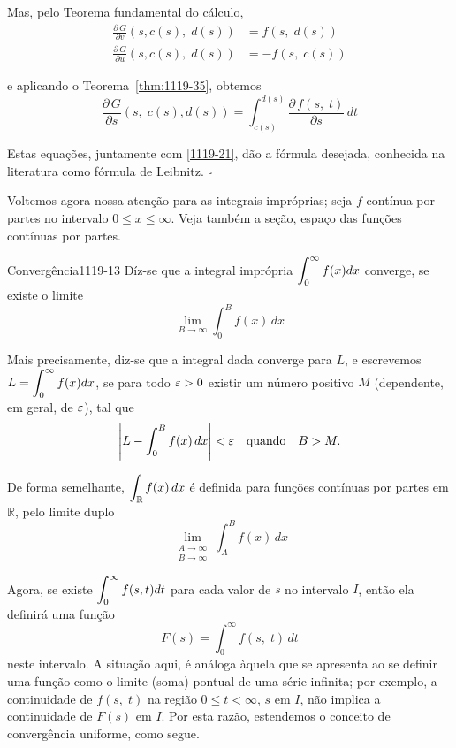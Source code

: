 Mas, pelo Teorema fundamental do cálculo,
\begin{align*}
  \frac{\partial\, G}{\partial v}(s,c(s),\; d(s)) &= f(s,\; d(s))\\[2ex]
  \frac{\partial\, G}{\partial u}(s,c(s),\; d(s)) &=-f(s,\; c(s))
\end{align*}

e aplicando o Teorema~\ref{thm:1119-35}, obtemos
\begin{equation*}
  \dfrac{\partial\, G}{\partial s}(s,\; c(s),d(s))=\int_{c(s)}^{d(s)}
    \dfrac{\partial\, f(s,\; t)}{\partial s}\, dt
\end{equation*}

Estas equações, juntamente com \eqref{1119-21}, dão a fórmula
desejada, conhecida na literatura como fórmula de Leibnitz.\hfill
$\square$

Voltemos agora nossa atenção para as integrais impróprias; seja
$f$ contínua por partes no intervalo $0\leq x \leq \infty$. Veja também a
seção, espaço das funções contínuas por partes.


\begin{defic}{Convergência}{1119-13} Díz-se que a integral imprópria
$\displaystyle{\int_0^\infty f(x)dx}$ converge, se existe o limite
\begin{equation*}
  \lim_{B\to \infty} \int_0^Bf(x)\, dx
\end{equation*}

Mais precisamente, diz-se que a integral dada converge para $L$, e
escrevemos $\displaystyle{L = \int_0^\infty f(x) dx}$, se para todo $\varepsilon >
0$ existir um número positivo $M$ (dependente, em geral, de
$\varepsilon$), tal que
\begin{equation*}
  \left|L - \int_0^Bf(x)\, dx\right| < \varepsilon\quad  \text{quando}\quad B> M.
\end{equation*}
\end{defic}

De forma semelhante, $\displaystyle{\int_{\mathbb{R}}f(x)\, dx}$ é definida
para funções contínuas por partes em $\mathbb{R}$, pelo limite
duplo
\begin{equation}
\lim_{\substack{A\to\infty\\B\to\infty}}\int_A^B f(x)\, dx
\end{equation}

Agora, se existe $\displaystyle{\int_0^\infty f(s, t) dt}$ para cada valor
de $s$ no intervalo $I$, então ela definirá uma função
\begin{equation*}
  F(s)=\int_0^\infty f(s,\; t)\, dt
\end{equation*}
neste intervalo. A situação aqui, é análoga àquela que se
apresenta ao se definir uma função como o limite (soma) pontual de
uma série infinita; por exemplo, a continuidade de $f(s,\; t)$ na
região $0 \leq t < \infty$, $s$ em $I$, não implica a continuidade
de $F(s)$ em $I$. Por esta razão, estendemos o conceito de
convergência uniforme, como segue.

